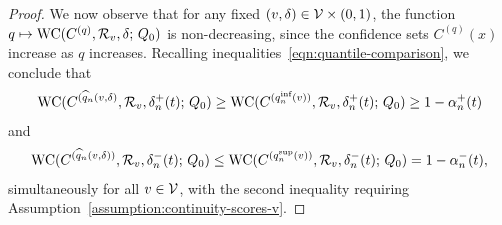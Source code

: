 \begin{proof}
  We now observe that for any fixed $(v, \delta) \in \mathcal{V} \times (0,1)$,
  the function $q \mapsto \textup{WC}(C^{(q)}, \mathcal{R}_v, \delta; \, Q_0)$ is
  non-decreasing, since the confidence sets $C^{(q)}(x)$ increase as $q$
  increases.  Recalling inequalities~\eqref{eqn:quantile-comparison}, we
  conclude that
\begin{align*}
\textup{WC}(C^{(\widehat{q}_n(v, \delta)}, \mathcal{R}_v,
      \delta_{n}^{+}(t); \, Q_0) \ge 
      \textup{WC}(C^{(q_n^\text{inf}(v))}, \mathcal{R}_v,
      \delta_{n}^{+}(t); \, Q_0) 
      \ge 1 - \alpha_n^+(t) 
      \end{align*}
and
\begin{align*}
  \textup{WC}(C^{( \widehat{q}_n(v, \delta))}, \mathcal{R}_v,
      \delta_{n}^{-}(t); \, Q_0) \le  
      \textup{WC}(C^{(q_n^\text{sup}(v))}, \mathcal{R}_v,
      \delta_{n}^{-}(t); \, Q_0) 
      = 1 - \alpha_n^-(t),
\end{align*}
simultaneously for all $v \in \mathcal{V}$, with the second inequality requiring Assumption~\ref{assumption:continuity-scores-v}.
\end{proof}


